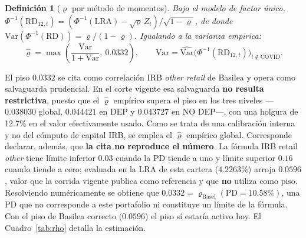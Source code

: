 \documentclass[12pt, a4paper]{article}
\newcommand{\RD}{\ensuremath{\mathrm{RD}}}
\newcommand{\LRA}{\ensuremath{\mathrm{LRA}}}
\renewcommand{\rho}{\ensuremath{\varrho}}
\newtheorem{definicion}{Definición}[section]
\begin{document}
\begin{definicion}[$\rho$ por método de momentos]
Bajo el modelo de factor único, $\Phi^{-1}(\RD_{12,t})=(\Phi^{-1}(\LRA)-\sqrt{\rho}\,Z_t)/\sqrt{1-\rho}$,
de donde $\mathrm{Var}(\Phi^{-1}(\RD))=\rho/(1-\rho)$. Igualando a la varianza empirica:
\begin{equation}
  \hat{\rho} = \max\!\left(\frac{\mathrm{Var}}{1+\mathrm{Var}},\ 0.0332\right),
  \qquad \mathrm{Var}=\widehat{\mathrm{Var}}\big(\Phi^{-1}(\RD_{12,t})\big)_{t\notin\text{COVID}}.
\end{equation}
\end{definicion}
El piso $0.0332$ se cita como correlación IRB \emph{other retail} de Basilea y opera como
salvaguarda prudencial. En el corte vigente esa salvaguarda \textbf{no resulta restrictiva}, puesto
que el $\hat{\rho}$ empírico supera el piso en los tres niveles ---$0.038030$ global, $0.044421$ en
DEP y $0.043727$ en NO DEP---, con una holgura de 12.7\% en el valor efectivamente usado. Como se
trata de una calibración interna y no del cómputo de capital IRB, se emplea el $\hat{\rho}$ empírico
global. Corresponde declarar, además, que \textbf{la cita no reproduce el número}. La fórmula IRB
retail \emph{other} tiene límite inferior $0.03$ cuando la PD tiende a uno y límite superior $0.16$
cuando tiende a cero; evaluada en la LRA de esta cartera ($4.2263\%$) arroja $0.0596$, valor que la
corrida vigente publica como referencia y que \textbf{no} utiliza como piso. Resolviendo
numéricamente se obtiene que $0.0332=\rho_{\text{Basel}}(\text{PD}=10.58\%)$, una PD que no
corresponde a este portafolio ni constituye un límite de la fórmula. Con el piso de Basilea correcto
($0.0596$) el piso sí estaría activo hoy. El Cuadro~\ref{tab:rho} detalla la estimación.
\end{document}
